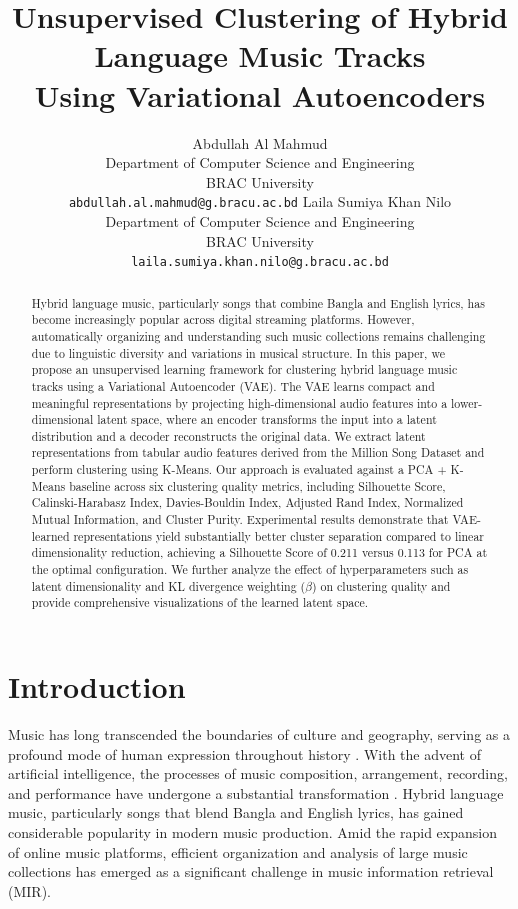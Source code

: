\documentclass[11pt]{article}
\title{Unsupervised Clustering of Hybrid Language Music Tracks\\Using Variational Autoencoders}
\author{
  Abdullah Al Mahmud \\
  Department of Computer Science and Engineering \\
  BRAC University \\
  \texttt{abdullah.al.mahmud@g.bracu.ac.bd}
  \And
  Laila Sumiya Khan Nilo \\
  Department of Computer Science and Engineering \\
  BRAC University \\
  \texttt{laila.sumiya.khan.nilo@g.bracu.ac.bd}
}
\date{}
\begin{document}
\maketitle

\begin{abstract}
Hybrid language music, particularly songs that combine Bangla and English lyrics, has become increasingly popular across digital streaming platforms. However, automatically organizing and understanding such music collections remains challenging due to linguistic diversity and variations in musical structure. In this paper, we propose an unsupervised learning framework for clustering hybrid language music tracks using a Variational Autoencoder (VAE). The VAE learns compact and meaningful representations by projecting high-dimensional audio features into a lower-dimensional latent space, where an encoder transforms the input into a latent distribution and a decoder reconstructs the original data. We extract latent representations from tabular audio features derived from the Million Song Dataset and perform clustering using K-Means. Our approach is evaluated against a PCA + K-Means baseline across six clustering quality metrics, including Silhouette Score, Calinski-Harabasz Index, Davies-Bouldin Index, Adjusted Rand Index, Normalized Mutual Information, and Cluster Purity. Experimental results demonstrate that VAE-learned representations yield substantially better cluster separation compared to linear dimensionality reduction, achieving a Silhouette Score of 0.211 versus 0.113 for PCA at the optimal configuration. We further analyze the effect of hyperparameters such as latent dimensionality and KL divergence weighting ($\beta$) on clustering quality and provide comprehensive visualizations of the learned latent space.
\end{abstract}

\section{Introduction}

Music has long transcended the boundaries of culture and geography, serving as a profound mode of human expression throughout history \citep{somyaji2025melody}. With the advent of artificial intelligence, the processes of music composition, arrangement, recording, and performance have undergone a substantial transformation \citep{fiorio2025clustering}. Hybrid language music, particularly songs that blend Bangla and English lyrics, has gained considerable popularity in modern music production. Amid the rapid expansion of online music platforms, efficient organization and analysis of large music collections has emerged as a significant challenge in music information retrieval (MIR).
\end{document}
